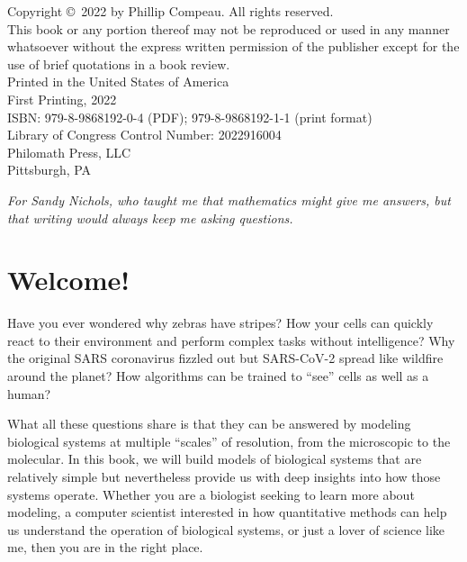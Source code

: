 \noindent Copyright ©~2022 by Phillip Compeau. All rights reserved.\\

\noindent This book or any portion thereof may not be reproduced or used in any manner whatsoever without the express written permission of the publisher except for the use of brief quotations in a book review.\\

\noindent Printed in the United States of America\\

\noindent First Printing, 2022\\

\noindent ISBN: 979-8-9868192-0-4 (PDF); 979-8-9868192-1-1 (print format)\\

\noindent Library of Congress Control Number: 2022916004\\

\noindent Philomath Press, LLC\\
Pittsburgh, PA
\addtocounter{page}{-1}


\begin{dedication}
\textit{For Sandy Nichols, who taught me that mathematics might give me answers, but that writing would always keep me asking questions.}\\[\baselineskip]
\thispagestyle{empty}
\end{dedication}

\newpage
{}

\addtocounter{page}{-1}


\newpage \phantom{}
\thispagestyle{empty}
\addtocounter{page}{-1}

\newpage
{}
\chapter{Welcome!}

Have you ever wondered why zebras have stripes? How your cells can quickly react to their environment and perform complex tasks without intelligence? Why the original SARS coronavirus fizzled out but SARS-CoV-2 spread like wildfire around the planet? How algorithms can be trained to ``see'' cells as well as a human?

What all these questions share is that they can be answered by modeling biological systems at multiple ``scales'' of resolution, from the microscopic to the molecular. In this book, we will build models of biological systems that are relatively simple but nevertheless provide us with deep insights into how those systems operate. Whether you are a biologist seeking to learn more about modeling, a computer scientist interested in how quantitative methods can help us understand the operation of biological systems, or just a lover of science like me, then you are in the right place.


